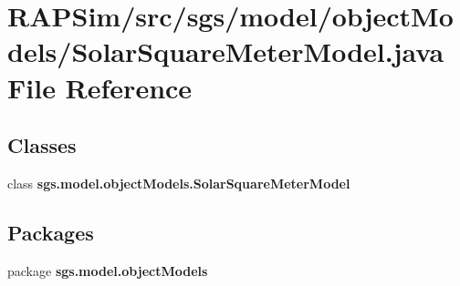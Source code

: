 \section{R\-A\-P\-Sim/src/sgs/model/object\-Models/\-Solar\-Square\-Meter\-Model.java File Reference}
\label{_solar_square_meter_model_8java}
\subsection*{Classes}
\begin{DoxyCompactItemize}
\item 
class {\bf sgs.\-model.\-object\-Models.\-Solar\-Square\-Meter\-Model}
\end{DoxyCompactItemize}
\subsection*{Packages}
\begin{DoxyCompactItemize}
\item 
package {\bf sgs.\-model.\-object\-Models}
\end{DoxyCompactItemize}

